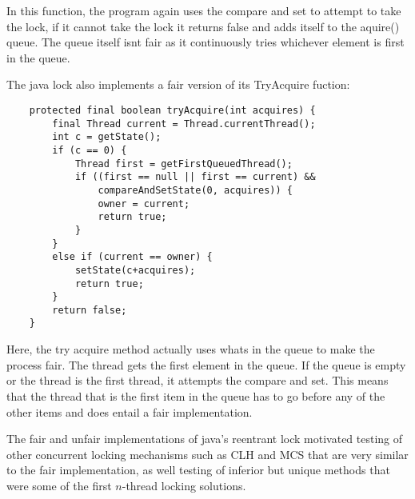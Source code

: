 \documentclass[FinalReport.tex]{subfiles}
\begin{document}
	\smallskip

	In this function, the program again uses the compare and set to attempt to take the lock, if it cannot take the lock it returns false and adds itself to the aquire() queue. The queue itself isnt fair as it continuously tries whichever element is first in the queue.

	The java lock also implements a fair version of its TryAcquire fuction:

	\begin{lstlisting}
    protected final boolean tryAcquire(int acquires) { 
        final Thread current = Thread.currentThread();
        int c = getState();
        if (c == 0) {
            Thread first = getFirstQueuedThread();
            if ((first == null || first == current) && 
                compareAndSetState(0, acquires)) {
                owner = current;
                return true;
            }
        }
        else if (current == owner) {
            setState(c+acquires);
            return true;
        }
        return false;
    }
    \end{lstlisting}

    Here, the try acquire method actually uses whats in the queue to make the process fair. The thread gets the first element in the queue. If the queue is empty or the thread is the first thread, it attempts the compare and set. This means that the thread that is the first item in the queue has to go before any of the other items and does entail a fair implementation.

	The fair and unfair implementations of java's reentrant lock motivated testing of other concurrent locking mechanisms such as CLH and MCS that are very similar to the fair implementation, as well testing of inferior but unique methods that were some of the first $n$-thread locking solutions.
\end{document}

